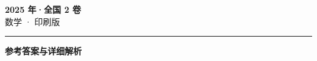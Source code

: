 \documentclass[zihao=5, a4paper]{ctexart}
\begin{document}
\begin{center}
  {\Large\bfseries 2025 年·全国 2 卷}\\[4pt]
  {\large 数学 · 印刷版}
\end{center}
\medskip
{}

\par\bigskip\hrule\bigskip
{}
\begin{center}{\large\bfseries 参考答案与详细解析}\end{center}
\smallskip

\end{document}
